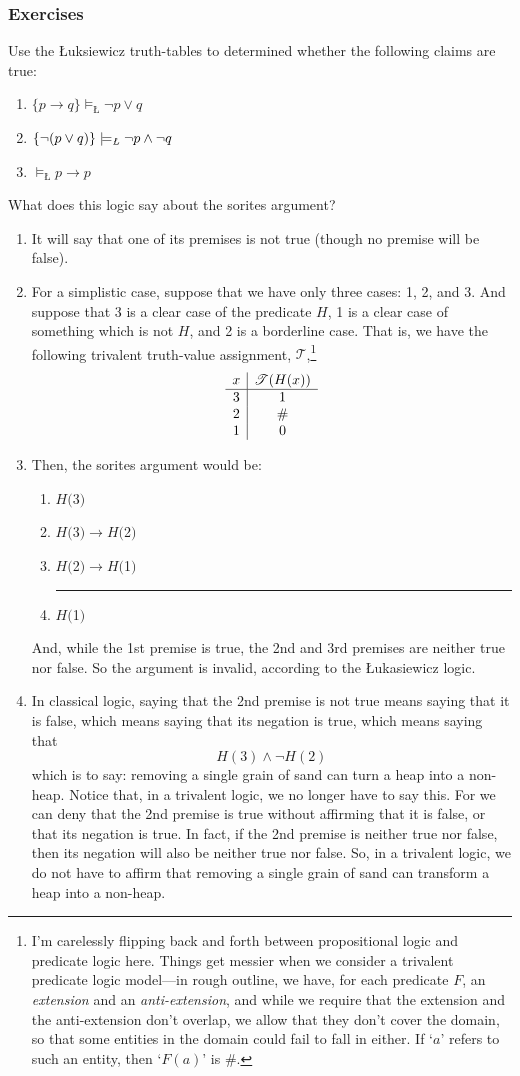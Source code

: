 \documentclass[landscape, two column, full page,reqno]{article}
\newcommand{\qe}{\begin{enumerate}[align=left,style=nextline,leftmargin=17pt,labelsep=5pt,font=\normalfont]}
\newcommand{\e}{\emph}
\newcommand{\ze}{\end{enumerate}}
\newcommand{\p}{\item}
\newcommand{\thus}{

\vspace{5pt}
\hrule
}
\newcommand{\I}{\mathscr{T}}
\newcommand{\argu}[2]{\begin{center}\begin{minipage}{#1} \begin{enumerate}
	#2
\end{enumerate}
\end{minipage}  
\end{center}}
\begin{document}
	\subsubsection*{Exercises}
Use the \L uksiewicz truth-tables to determined whether the following claims are true:
	\qe
	\p $\{ p \to q \} \models_{\text{\L}} \neg p \vee q$
	\p $\{ \neg (p \vee q) \} \models_{\text{\e{\L}}} \neg p \wedge \neg q$
	\p $\models_{\text{\L}} p \to p$
	\ze 

\p What does this logic say about the sorites argument?  
	\qe
	\p It will say that one of its premises is not true (though no premise will be false).  
	\p For a simplistic case, suppose that we have only three cases: 1, 2, and 3.  And suppose that 3 is a clear case of the predicate $H$, 1 is a clear case of something which is not $H$, and 2 is a borderline case.   That is, we have the following trivalent truth-value assignment, $\I$,\footnote{ I'm carelessly flipping back and forth between propositional logic and predicate logic here.  Things get messier when we consider a trivalent predicate logic model---in rough outline, we have, for each predicate $F$, an \e{extension} and an \e{anti-extension}, and while we require that the extension and the anti-extension don't overlap, we allow that they don't cover the domain, so that some entities in the domain could fail to fall in either.  If `$a$' refers to such an entity, then `$F(a)$' is $\#$.}
			\[
			\begin{array}{ c | c}
			x		&		\I(H(x))		\\\hline
			\text{3}	&		1			\\
			\text{2}	&		\#			\\
			\text{1}	&		0
			\end{array}	
			\]
	\p Then, the sorites argument would be:
			\argu{100pt}{
			\p[] $H($3$)$
			\p[] $H($3$) \to H($2$)$
			\p[] $H($2$) \to H($1$)$ 
			\thus
			\p[] $H($1$)$
			}
	And, while the 1st premise is true, the 2nd and 3rd premises are neither true nor false.  So the argument is invalid, according to the \L ukasiewicz logic.
	\p In classical logic, saying that the 2nd premise is not true means saying that it is false, which means saying that its negation is true, which means saying that 
		\[
		H(\text{3}) \wedge \neg H(\text{2})
		\] 
	which is to say: removing a single grain of sand can turn a heap into a non-heap.  Notice that, in a trivalent logic, we no longer have to say this.  For we can deny that the 2nd premise is true without affirming that it is false, or that its negation is true.  In fact, if the 2nd premise is neither true nor false, then its negation will also be neither true nor false.  So, in a trivalent logic, we do not have to affirm that removing a single grain of sand can transform a heap into a non-heap.  
	\ze 
\end{document}
